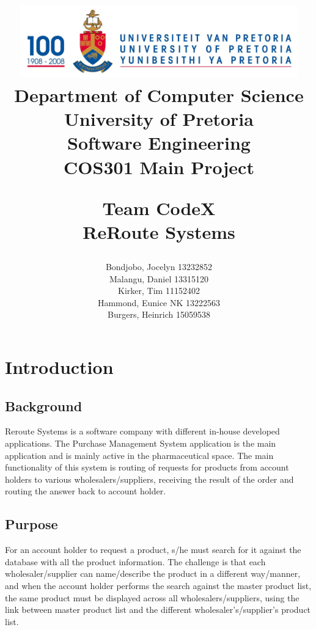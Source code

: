 \documentclass[a4paper,10pt]{article}
\title{\includegraphics[width=12cm]{Eeufeeslogo.jpg} \\
       Department of Computer Science \\
       University of Pretoria \\
       \vspace{0.5cm}
       Software Engineering\\
       COS301 Main Project \\
       \vspace{0.5cm}
       \begin{large} \textbf{Team CodeX}\\ ReRoute Systems\end{large}}
\date{}
\author{	Bondjobo, Jocelyn 		13232852 		\\
		Malangu, Daniel		13315120		\\
		Kirker, Tim			11152402		\\
		Hammond, Eunice	NK	13222563		\\
		Burgers, Heinrich		15059538		\\
}
\begin{document}
\maketitle
\thispagestyle{empty}
\clearpage

\newpage
{}
\thispagestyle{empty}
\tableofcontents
\clearpage

\newpage
{}

\section{Introduction}

	\subsection{Background} 
	Reroute Systems is a software company with different in-house developed applications. The Purchase Management System application is the main application and is mainly active in the pharmaceutical space. The main functionality of this system is routing of requests for products from account holders to various wholesalers/suppliers, receiving the result of the order and routing the answer back to account holder.
	
	\subsection{Purpose} 	
	For an account holder to request a product, s/he must search for it against the database with all the product information. The challenge is that each wholesaler/supplier can name/describe the product in a different way/manner, and when the account holder performs the search against the master product list, the same product must be displayed across all wholesalers/suppliers, using the link between master product list and the different wholesaler's/supplier's product list.
\end{document}
